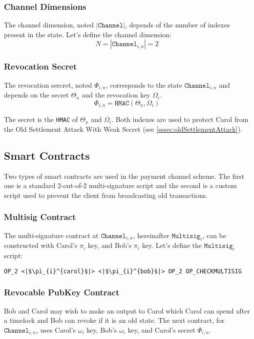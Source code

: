 \documentclass{llncs}
\begin{document}
\subsubsection{Channel Dimensions} The channel dimension, noted
$|\texttt{Channel}|$, depends of the number of indexes present in the state.
Let's define the channel dimension:
\[ N = |\texttt{Channel}_{i,n}| = 2
\]

\subsubsection{Revocation Secret} The revocation sercret, noted $\Phi_{i,n}$,
corresponds to the state $\texttt{Channel}_{i,n}$ and depends on the secret
$\Theta_{n}$ and the revocation key $\Omega_{i}$.
\[ \Phi_{i,n} = \texttt{HMAC}(\Theta_{n}, \Omega_{i})
\]

The secret is the \texttt{HMAC} of $\Theta_{n}$ and $\Omega_{i}$. Both indexes
are used to protect Carol from the Old Settlement Attack With Weak Secret (see
\ref{sssec:oldSettlementAttack}).

\subsection{Smart Contracts}
\label{ssec:SmartContracts} Two types of smart contracts are used in the payment
channel scheme. The first one is a standard 2-out-of-2 multi-signature script
and the second is a custom script used to prevent the client from broadcasting
old transactions.

\subsubsection{Multisig Contract} The multi-signature contract at
$\texttt{Channel}_{i,n}$, hereinafter $\texttt{Multisig}_{i}$, can be
constructed with Carol's $\pi_{i}$ key, and Bob's $\pi_{i}$ key. Let's define
the $\texttt{Multisig}_{i}$ script:

\begin{verbatim}
OP_2 <|$\pi_{i}^{carol}$|> <|$\pi_{i}^{bob}$|> OP_2 OP_CHECKMULTISIG
\end{verbatim}

\subsubsection{Revocable PubKey Contract} Bob and Carol may wish to make an
output to Carol which Carol can spend after a timelock and Bob can revoke if it
is an old state. The next contract, for $\texttt{Channel}_{i,n}$, uses Carol's
$\omega_{i}$ key, Bob's $\omega_{i}$ key, and Carol's secret $\Phi_{i,n}$.
\end{document}
